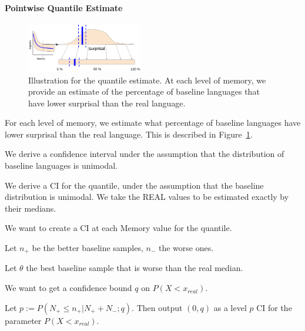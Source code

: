 \documentclass[11pt,letterpaper]{article}
\begin{document}




\paragraph{Pointwise Quantile Estimate}

\begin{figure}
	\begin{center}
\includegraphics[width=0.45\textwidth]{figures/quantile.png}
\end{center}
	\caption{Illustration for the quantile estimate. At each level of memory, we provide an estimate of the percentage of baseline languages that have lower surprisal than the real language.}\label{fig:quantile-pointwise}
\end{figure}


For each level of memory, we estimate what percentage of baseline languages have lower surprisal than the real language.
This is described in Figure~\ref{fig:quantile-pointwise}.

We derive a confidence interval under the assumption that the distribution of baseline languages is unimodal.

We derive a CI for the quantile, under the assumption that the baseline distribution is unimodal. We take the REAL values to be estimated exactly by their medians.

We want to create a CI at each Memory value for the quantile.

Let $n_+$ be the better baseline samples, $n_-$ the worse ones.

Let $\theta$ the best baseline sample that is worse than the real median.

We want to get a confidence bound $q$ on $P(X < x_{real})$.

Let $p := P(N_+ \leq n_+ | N_+ + N_-; q)$.
Then output $(0, q)$ as a level $p$ CI for the parameter $P(X < x_{real})$.
\end{document}
